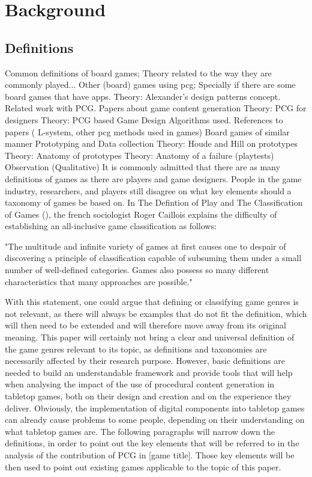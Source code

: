 \section{Background}
\subsection{Definitions}
Common definitions of board games; Theory related to the way they are commonly played...
Other (board) games using pcg; Specially if there are some board games that have apps. 
Theory: Alexander's design patterns concept.
Related work with PCG.
Papers about game content generation
Theory: PCG for designers
Theory: PCG based Game Design
Algorithms used.
References to papers ( L-system, other pcg methods used in games)
Board games of similar manner
Prototyping and Data collection 
Theory: Houde and Hill on prototypes
Theory: Anatomy of prototypes
Theory: Anatomy of a failure (playtests)
Observation (Qualitative)
It is commonly admitted that there are as many definitions of games as there are players and game designers. People in the game industry, researchers, and players still disagree on what key elements should a taxonomy of games be based on. In The Defintion of Play and The Classification of Games (), the french sociologist Roger Caillois explains the difficulty of establishing an all-inclusive game classification as follows:

"The multitude and infinite variety of games at first causes one to despair of discovering a principle of classification capable of subsuming them under a small number of well-defined categories. Games also possess so many different characteristics that many approaches are possible."

With this statement, one could argue that defining or classifying game genres is not relevant, as there will always be examples that do not fit the definition, which will then need to be extended and will therefore move away from its original meaning. This paper will certainly not bring a clear and universal definition of the game genres relevant to its topic, as definitions and taxonomies are necessarily affected by their research purpose. However, basic definitions are needed to build an understandable framework and provide tools that will help when analysing the impact of the use of procedural content generation in tabletop games, both on their design and creation and on the experience they deliver.
Obviously, the implementation of digital components into tabletop games can already cause problems to some people, depending on their understanding on what tabletop games are. The following paragraphs will narrow down the definitions, in order to point out the key elements that will be referred to in the analysis of the contribution of PCG in [game title]. Those key elements will be then used to point out existing games applicable to the topic of this paper.

